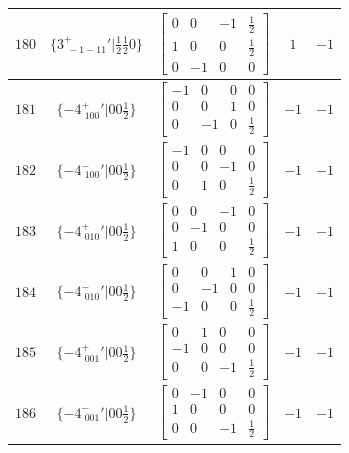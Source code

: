 \documentclass[fleqn,8pt]{jsarticle}
\begin{document}
\begin{longtable}{ccccc}
$ 180 $ & $ \{3^{+}_{\,\,-1-11}{}'|\frac{1}{2} \frac{1}{2} 0\} $ & $ \begin{bmatrix} 0 & 0 & -1 & \frac{1}{2} \\ 1 & 0 & 0 & \frac{1}{2} \\ 0 & -1 & 0 & 0 \end{bmatrix} $ & $ 1 $ & $ -1 $ \\ \hline
$ 181 $ & $ \{-4^{+}_{\,\,100}{}'|0 0 \frac{1}{2}\} $ & $ \begin{bmatrix} -1 & 0 & 0 & 0 \\ 0 & 0 & 1 & 0 \\ 0 & -1 & 0 & \frac{1}{2} \end{bmatrix} $ & $ -1 $ & $ -1 $ \\ \hline
$ 182 $ & $ \{-4^{-}_{\,\,100}{}'|0 0 \frac{1}{2}\} $ & $ \begin{bmatrix} -1 & 0 & 0 & 0 \\ 0 & 0 & -1 & 0 \\ 0 & 1 & 0 & \frac{1}{2} \end{bmatrix} $ & $ -1 $ & $ -1 $ \\ \hline
$ 183 $ & $ \{-4^{+}_{\,\,010}{}'|0 0 \frac{1}{2}\} $ & $ \begin{bmatrix} 0 & 0 & -1 & 0 \\ 0 & -1 & 0 & 0 \\ 1 & 0 & 0 & \frac{1}{2} \end{bmatrix} $ & $ -1 $ & $ -1 $ \\ \hline
$ 184 $ & $ \{-4^{-}_{\,\,010}{}'|0 0 \frac{1}{2}\} $ & $ \begin{bmatrix} 0 & 0 & 1 & 0 \\ 0 & -1 & 0 & 0 \\ -1 & 0 & 0 & \frac{1}{2} \end{bmatrix} $ & $ -1 $ & $ -1 $ \\ \hline
$ 185 $ & $ \{-4^{+}_{\,\,001}{}'|0 0 \frac{1}{2}\} $ & $ \begin{bmatrix} 0 & 1 & 0 & 0 \\ -1 & 0 & 0 & 0 \\ 0 & 0 & -1 & \frac{1}{2} \end{bmatrix} $ & $ -1 $ & $ -1 $ \\ \hline
$ 186 $ & $ \{-4^{-}_{\,\,001}{}'|0 0 \frac{1}{2}\} $ & $ \begin{bmatrix} 0 & -1 & 0 & 0 \\ 1 & 0 & 0 & 0 \\ 0 & 0 & -1 & \frac{1}{2} \end{bmatrix} $ & $ -1 $ & $ -1 $ \\ \hline

\end{longtable}
\end{document}
